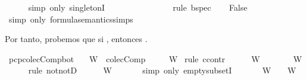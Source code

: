 \begin{isabellebody}
\ \ \ \ \isamarkupfalse%
\ {\isacharparenleft}simp\ only{\isacharcolon}\ singletonI{\isacharparenright}\isanewline
\ \ \isamarkupfalse%
\ {\isachardoublequoteopen}{\isasymA}\ {\isasymTurnstile}\ {\isasymbottom}{\isachardoublequoteclose}\isanewline
\ \ \ \ \isamarkupfalse%
\ {}\ {}\ \isamarkupfalse%
\ {\isacharparenleft}rule\ bspec{\isacharparenright}\isanewline
\ \ \isamarkupfalse%
\ {\isachardoublequoteopen}False{\isachardoublequoteclose}\isanewline
\ \ \ \ \isamarkupfalse%
\ {\isacharparenleft}simp\ only{\isacharcolon}\ formula{\isacharunderscore}semantics{\isachardot}simps{\isacharparenleft}{}{\isacharparenright}{\isacharparenright}\isanewline
{}\isamarkupfalse%
%
\endisatagproof
{\isafoldproof}%
%
\isadelimproof
%
\endisadelimproof
%
\begin{isamarkuptext}%
Por tanto, probemos que si , entonces .%
\end{isamarkuptext}\isamarkuptrue%
\isamarkupfalse%
\ pcp{\isacharunderscore}colecComp{\isacharunderscore}bot{\isacharcolon}\isanewline
\ \ \ {\isachardoublequoteopen}W\ {\isasymin}\ colecComp{\isachardoublequoteclose}\isanewline
\ \ \ {\isachardoublequoteopen}{\isasymbottom}\ {\isasymnotin}\ W{\isachardoublequoteclose}\isanewline
%
\isadelimproof
%
\endisadelimproof
%
\isatagproof
{}\isamarkupfalse%
\ {\isacharparenleft}rule\ ccontr{\isacharparenright}\isanewline
\ \ \isamarkupfalse%
\ {\isachardoublequoteopen}{\isasymnot}{\isacharparenleft}{\isasymbottom}\ {\isasymnotin}\ W{\isacharparenright}{\isachardoublequoteclose}\isanewline
\ \ \isamarkupfalse%
\ \isamarkupfalse%
\ {\isachardoublequoteopen}{\isasymbottom}\ {\isasymin}\ W{\isachardoublequoteclose}\isanewline
\ \ \ \ \isamarkupfalse%
\ {\isacharparenleft}rule\ notnotD{\isacharparenright}\isanewline
\ \ \isamarkupfalse%
\ {\isachardoublequoteopen}{\isacharbraceleft}{\isacharbraceright}\ {\isasymsubseteq}\ W{\isachardoublequoteclose}\ \isanewline
\ \ \ \ \isamarkupfalse%
\ {\isacharparenleft}simp\ only{\isacharcolon}\ empty{\isacharunderscore}subsetI{\isacharparenright}\ \isanewline
\ \ \isamarkupfalse%
\ {\isachardoublequoteopen}{\isasymbottom}\ {\isasymin}\ W\ {\isasymand}\ {\isacharbraceleft}{\isacharbraceright}\ {\isasymsubseteq}\ W{\isachardoublequoteclose}\isanewline

\end{isabellebody}
